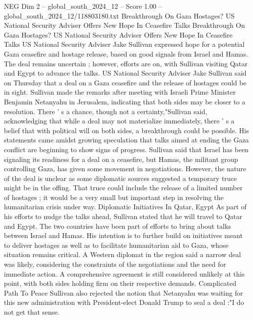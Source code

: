 \begin{textsample}{NEG Dim 2 – global\_south\_2024\_12 – Score 1.00 – global\_south\_2024\_12/118803180.txt}  \label{ex:f2_neg_388}
Breakthrough On Gaza Hostages?
US National Security Adviser Offers New Hope In Ceasefire Talks Breakthrough On Gaza Hostages?
US National Security Adviser Offers New Hope In Ceasefire Talks US National Security Adviser Jake Sullivan expressed hope for a potential Gaza ceasefire and hostage release, based on good signals from Israel and Hamas.
The deal remains uncertain ; however, efforts are on, with Sullivan visiting Qatar and Egypt to advance the talks.
US National Security Adviser Jake Sullivan said on Thursday that a deal on a Gaza ceasefire and the release of hostages could be in sight.
Sullivan made the remarks after meeting with Israeli Prime Minister Benjamin Netanyahu in Jerusalem, indicating that both sides may be closer to a resolution.
There ' s a chance, though not a certainty,"Sullivan said, acknowledging that while a deal may not materialize immediately, there ' s a belief that with political will on both sides, a breakthrough could be possible.
His statements came amidst growing speculation that talks aimed at ending the Gaza conflict are beginning to show signs of progress.
Sullivan said that Israel has been signaling its readiness for a deal on a ceasefire, but Hamas, the militant group controlling Gaza, has given some movement in negotiations.
However, the nature of the deal is unclear as some diplomatic sources suggested a temporary truce might be in the offing.
That truce could include the release of a limited number of hostages ; it would be a very small but important step in resolving the humanitarian crisis under way.
Diplomatic Initiatives In Qatar, Egypt As part of his efforts to nudge the talks ahead, Sullivan stated that he will travel to Qatar and Egypt.
The two countries have been part of efforts to bring about talks between Israel and Hamas.
His intention is to further build on initiatives meant to deliver hostages as well as to facilitate humanitarian aid to Gaza, whose situation remains critical.
A Western diplomat in the region said a narrow deal was likely, considering the constraints of the negotiations and the need for immediate action.
A comprehensive agreement is still considered unlikely at this point, with both sides holding firm on their respective demands.
Complicated Path To Peace Sullivan also rejected the notion that Netanyahu was waiting for this new administration with President-elect Donald Trump to seal a deal :"I do not get that sense.

\end{textsample}
